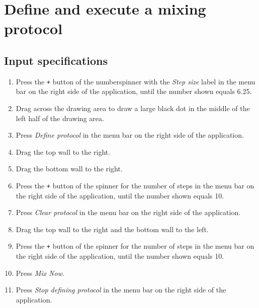 \section{Define and execute a mixing protocol}

\subsection*{Input specifications}
\begin{enumerate}
\item Press the \texttt{+} button of the numberspinner with the \emph{Step size} label in the menu bar on the right side of the application, until the number shown equals 6.25.
\item Drag across the drawing area to draw a large black dot in the middle of the left half of the drawing area.
\item Press \emph{Define protocol} in the menu bar on the right side of the application.
\item Drag the top wall to the right.
\item Drag the bottom wall to the right.

\item Press the \texttt{+} button of the spinner for the number of steps in the menu bar on the right side of the application, until the number shown equals 10.
\item Press \emph{Clear protocol} in the menu bar on the right side of the application.
\item Drag the top wall to the right and the bottom wall to the left.
\item Press the \texttt{+} button of the spinner for the number of steps in the menu bar on the right side of the application, until the number shown equals 10.
\item Press \emph{Mix Now}.

\item Press \emph{Stop defining protocol} in the menu bar on the right side of the application.
\end{enumerate}

